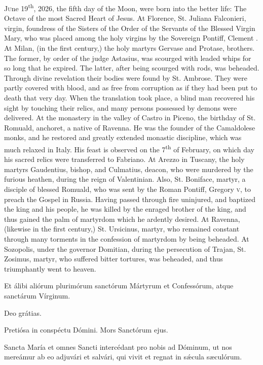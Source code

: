 \begin{enpars}
\lettrine[lraise=0.2]{J}{u}ne 19\textsuperscript{th}, 2026, the fifth day of the Moon, were born into the better life:
The Octave of the most Sacred Heart of Jesus.
At Florence, St. Juliana Falconieri, virgin, foundress of the Sisters of the Order of the Servants of the Blessed Virgin Mary, who was placed among the holy virgins by the Sovereign Pontiff, Clement .
At Milan, (in the first century,) the holy martyrs Gervase and Protase, brothers. The former, by order of the judge Astasius, was scourged with leaded whips for so long that he expired. The latter, after being scourged with rods, was beheaded. Through divine revelation their bodies were found by St. Ambrose. They were partly covered with blood, and as free from corruption as if they had been put to death that very day. When the translation took place, a blind man recovered his sight by touching their relics, and many persons possessed by demons were delivered.
At the monastery in the valley of Castro in Piceno, the birthday of St. Romuald, anchoret, a native of Ravenna. He was the founder of the Camaldolese monks, and he restored and greatly extended monastic discipline, which was much relaxed in Italy. His feast is observed on the 7\textsuperscript{th} of February, on which day his sacred relics were transferred to Fabriano.
At Arezzo in Tuscany, the holy martyrs Gaudentius, bishop, and Culmatius, deacon, who were murdered by the furious heathen, during the reign of Valentinian.
Also, St. Boniface, martyr, a disciple of blessed Romuald, who was sent by the Roman Pontiff, Gregory \textsc{v}, to preach the Gospel in Russia. Having passed through fire uninjured, and baptized the king and his people, he was killed by the enraged brother of the king, and thus gained the palm of martyrdom which he ardently desired.
At Ravenna, (likewise in the first century,) St. Ursicinus, martyr, who remained constant through many torments in the confession of martyrdom by being beheaded.
At Sozopolis, under the governor Domitian, during the persecution of Trajan, St. Zosimus, martyr, who suffered bitter tortures, was beheaded, and thus triumphantly went to heaven.
\end{enpars}

\vv Et álibi aliórum plurimórum sanctórum Mártyrum et Confessórum, atque sanctárum Vírginum.

\rr Deo grátias.

\vv Pretiósa in conspéctu Dómini. \rr Mors Sanctórum ejus.

Sancta María et omnes Sancti intercédant pro nobis ad Dóminum, ut nos
mereámur ab eo adjuvári et salvári, qui vivit et regnat in sǽcula sæculórum.

